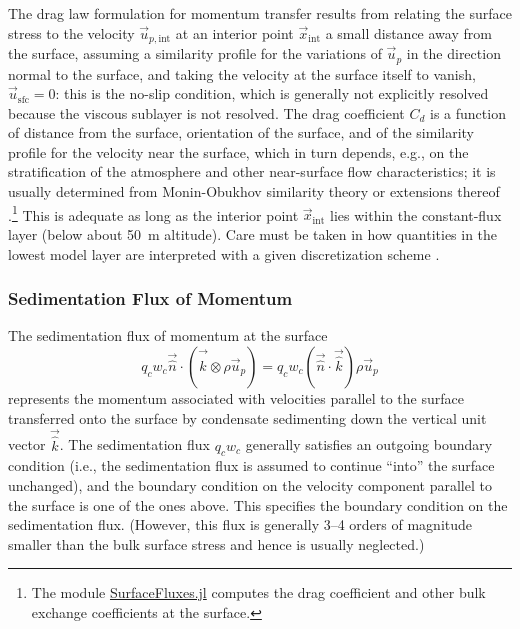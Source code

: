 \documentclass{report}
\begin{document}
The drag law formulation for momentum transfer results from relating the surface stress to the velocity $\vec{u}_{p, \mathrm{int}}$ at an interior point $\vec{x}_\mathrm{int}$ a small distance away from the surface, assuming a similarity profile for the variations of $\vec{u}_p$ in the direction normal to the surface, and taking the velocity at the surface itself to vanish, $\vec{u}_\mathrm{sfc} =0$: this is the no-slip condition, which is generally not explicitly resolved because the viscous sublayer is not resolved. The drag coefficient  $C_d$ is a function of distance from the surface, orientation of the surface, and of the similarity profile for the velocity near the surface, which in turn depends, e.g., on the stratification of the atmosphere and other near-surface flow characteristics; it is usually determined from Monin-Obukhov similarity theory or extensions thereof \citep{Foken06a}.\footnote{The module \href{https://github.com/climate-machine/CLIMA/tree/master/src/Atmos/Parameterizations/SurfaceFluxes}{SurfaceFluxes.jl} computes the drag coefficient and other bulk exchange coefficients at the surface.} This is adequate as long as the interior point $\vec{x}_\mathrm{int}$ lies within the constant-flux layer (below about 50~m altitude). Care must be taken in how quantities in the lowest model layer are interpreted with a given discretization scheme \citep{Nishizawa18a}.



\subsubsection{Sedimentation Flux of Momentum}

The sedimentation flux of momentum at the surface
\[
 q_c w_c \vec{\hat n} \cdot (\vec{\hat k} \otimes \rho \vec{u}_p) = q_c w_c (\vec{\hat n} \cdot \vec{\hat k}) \rho \vec{u}_p
\]
represents the momentum associated with velocities parallel to the surface transferred onto the surface by condensate sedimenting down the vertical unit vector $\vec{\hat k}$. The sedimentation flux $q_c w_c$ generally satisfies an outgoing boundary condition (i.e., the sedimentation flux is assumed to continue ``into'' the surface unchanged), and the boundary condition on the velocity component parallel to the surface is one of the ones above. This specifies the boundary condition on the sedimentation flux. (However, this flux is generally 3--4 orders of magnitude smaller than the bulk surface stress and hence is usually neglected.)
\end{document}
